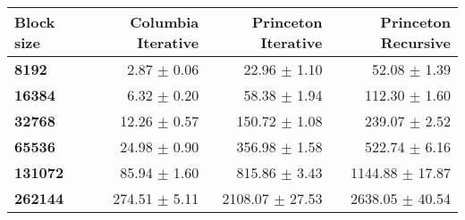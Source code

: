 \begin{tabular}{lrrr}\toprule
\textbf{Block size}  & \textbf{Columbia Iterative} & \textbf{Princeton Iterative} & \textbf{Princeton Recursive}\\\midrule
\textbf{8192}  & 2.87 $\pm$ 0.06 & 22.96 $\pm$ 1.10 & 52.08 $\pm$ 1.39\\
\textbf{16384}  & 6.32 $\pm$ 0.20 & 58.38 $\pm$ 1.94 & 112.30 $\pm$ 1.60\\
\textbf{32768}  & 12.26 $\pm$ 0.57 & 150.72 $\pm$ 1.08 & 239.07 $\pm$ 2.52\\
\textbf{65536}  & 24.98 $\pm$ 0.90 & 356.98 $\pm$ 1.58 & 522.74 $\pm$ 6.16\\
\textbf{131072}  & 85.94 $\pm$ 1.60 & 815.86 $\pm$ 3.43 & 1144.88 $\pm$ 17.87\\
\textbf{262144} & 274.51 $\pm$ 5.11 & 2108.07 $\pm$ 27.53 & 2638.05 $\pm$ 40.54\\
\bottomrule
\end{tabular}
